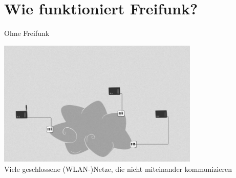 \documentclass[10pt]{beamer}
\begin{document}



\section{Wie funktioniert Freifunk?}

\begin{frame}{Ohne Freifunk}
	\begin{center}
		\includegraphics[height=6cm]{images/network_1} \\
		\vfill
		Viele geschlossene (WLAN-)Netze, die nicht miteinander kommunizieren
	\end{center}
\end{frame}
\end{document}
